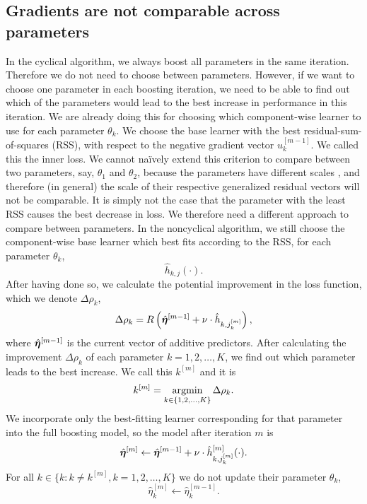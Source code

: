 \subsection{Gradients are not comparable across parameters}
In the cyclical algorithm, we always boost all parameters in the same iteration.
Therefore we do not need to choose between parameters.
However, if we want to choose one parameter in each boosting iteration, we need to be able to find out which of the parameters would lead to the best increase in performance in this iteration.
We are already doing this for choosing which component-wise learner to use for each parameter $\theta_k$.
We choose the base learner with the best residual-sum-of-squares (RSS), with respect to the negative gradient vector $u_k^{[m-1]}$.
We called this the inner loss.
We cannot naïvely extend this criterion to compare between two parameters, say, $\theta_1$ and $\theta_2$, because the parameters have different scales \citep{thomas2018}, and therefore (in general) the scale of their respective generalized residual vectors will not be comparable.
It is simply not the case that the parameter with the least RSS causes the best decrease in loss.
We therefore need a different approach to compare between parameters.
In the noncyclical algorithm, we still choose the component-wise base learner which best fits according to the RSS, for each parameter $\theta_k$,
\begin{equation*}
    \hat{h}_{k,j}(\cdot).
\end{equation*}
After having done so, we calculate the potential improvement in the loss function, which we denote $\Delta\rho_{k}$,
\begin{equation*}
    \Delta\rho_{k}=R\left(\hat{\boldsymbol{\eta}}^{[m-1]}+\nu\cdot\hat{h}_{k,j_{k}^{[m]}}\right),
\end{equation*}
where $\hat{\boldsymbol{\eta}}^{[m-1]}$ is the current vector of additive predictors.
After calculating the improvement $\Delta\rho_{k}$ of each parameter $k=1,2,\ldots,K$, we find out which parameter leads to the best increase.
We call this $k^{[m]}$ and it is
\begin{equation*}
    k^{[m]}=\operatorname*{argmin}_{k\in\{1,2,\ldots,K\}}\Delta\rho_{k}.
\end{equation*}
We incorporate only the best-fitting learner corresponding for that parameter into the full boosting model, so the model after iteration $m$ is
\begin{equation*}
    \hat{\boldsymbol{\eta}}^{[m]}\gets \hat{\boldsymbol{\eta}}^{[m-1]}+\nu\cdot\hat{h}^{[m]}_{k,j_k^{[m]}}(\cdot).
\end{equation*}
For all $k\in\{k\colon k\neq k^{[m]}, k=1,2,\ldots,K\}$ we do not update their parameter $\theta_k$,
\begin{equation*}
    \hat{\eta}_{k}^{[m]}\gets\hat{\eta}_{k}^{[m-1]}.
\end{equation*}

